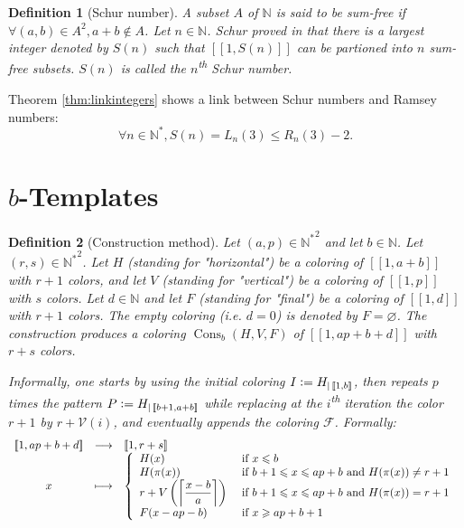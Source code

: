 \documentclass{article}
\newtheorem{definition}{Definition}[section]
\DeclareMathOperator{\cons}{Cons}
\newcommand{\defeq}{\vcentcolon=}
\begin{document}
\begin{definition}[Schur number]
A subset \(A\) of \(\mathbb{N}\) is said to be sum-free if \(\forall (a, b) \in A^2, a + b \notin A\). Let 
\(n \in \mathbb{N}\). Schur proved in \cite{Schur1917} that there is a largest integer denoted by \(S(n)\) such that 
\([\![1, S(n)]\!]\) can be partioned into \(n\) sum-free subsets. \(S(n)\) is called the \(n\)\textsuperscript{th} 
Schur number.
\end{definition}

Theorem \ref{thm:linkintegers} shows a link between Schur numbers and Ramsey numbers:
\[\forall n \in \mathbb{N}^*, S(n) = L_n(3) \leqslant R_n(3) - 2.\]

\section{\(b\)-Templates}
\label{sec:temp}

\begin{definition}[Construction method]
Let \((a, p) \in {\mathbb{N}^*}^2\) and let \(b \in \mathbb{N}\). Let \((r, s) \in {\mathbb{N}^*}^2\). Let \(H\) 
(standing for "horizontal") be a coloring of \([\![1, a + b]\!]\) with \(r + 1\) colors, and let \(V\)  (standing for 
"vertical") be a coloring of \([\![1, p]\!]\) with \(s\) colors. Let \(d \in \mathbb{N}\) and let \(F\) (standing for 
"final") be a coloring of \([\![1, d]\!]\) with \(r + 1\) colors. The empty coloring (i.e. \(d = 0\)) is denoted by 
\(F = \varnothing\). The construction produces a coloring \(\cons_b(H, V, F)\) of \([\![1, a p + b + d]\!]\) with 
\(r + s\) colors.

Informally, one starts by using the initial coloring \(I \defeq H_{| \, [\![1, b]\!]}\), then repeats \(p\) times the 
pattern \(P \defeq H_{| \, [\![b + 1, a + b]\!]}\) while replacing at the \(i\)\textsuperscript{th} iteration the color 
\(r + 1\) by \(r + \mathcal{V}(i)\), and eventually appends the coloring \(\mathcal{F}\). Formally:
\[\begin{array}{ccl}
	[\![1, a p + b + d]\!]  & \longrightarrow &  [\![1, r + s]\!] \\
 	x & \longmapsto & 
		\left\{\begin{array}{l l}
			H(x) & ~\text{if}~ x \leqslant b \\
			H(\pi(x)) & ~\text{if}~  b + 1 \leqslant x \leqslant a p + b ~\text{and}~ H(\pi(x)) \neq r + 1 \\
			r + V \left(\left\lceil \dfrac{x - b}{a} \right\rceil\right) & ~\text{if}~ b + 1 \leqslant x \leqslant a p + b 
				~\text{and}~ H(\pi(x)) = r + 1 \\
			F(x - a p - b) & ~\text{if}~ x \geqslant a p + b + 1
		\end{array}\right.
\end{array}\]
\end{definition}
\end{document}
